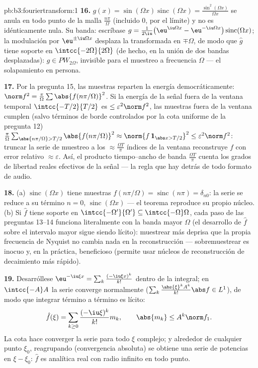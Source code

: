 \begin{solution}{pb:b3:fouriertransform:1}
\textbf{16.} $g(x) = \sin(\Omega x)\operatorname{sinc}
(\Omega x) = \frac{\sin^2(\Omega x)}{\Omega x}$ se anula en todo punto
de la malla $\frac{n\pi}\Omega$ (incluido $0$, por el límite) y no es
idénticamente nula. Su banda: escríbase $g =
\frac1{2\iu}\bigl(\eu^{\iu\Omega x} - \eu^{-\iu\Omega
x}\bigr)\operatorname{sinc}(\Omega x)$; la modulación por
$\eu^{\pm\iu\Omega x}$ desplaza la transformada en $\mp\Omega$, de modo
que $\hat g$ tiene soporte en $\intcc{-2\Omega}{2\Omega}$ (de hecho, en
la unión de dos bandas desplazadas): $g \in PW_{2\Omega}$, invisible
para el muestreo a frecuencia $\Omega$ --- el solapamiento en persona.

\textbf{17.} Por la pregunta 15, las muestras reparten la energía
democráticamente: $\norm f^2 = \frac\pi\Omega\sum
\abs{f(n\pi/\Omega)}^2$. Si la energía de la señal fuera de la ventana
temporal $\intcc{-T/2}{T/2}$ es $\leq \varepsilon^2\norm
f^2$, las muestras fuera de la ventana cumplen (salvo términos de borde
controlados por la cota uniforme de la pregunta 12)
$\frac\pi\Omega\sum_{\abs{n\pi/\Omega} > T/2}
\abs{f(n\pi/\Omega)}^2 \approx \norm{f\,\mathbf 1_{\abs x >
T/2}}^2 \leq \varepsilon^2\norm f^2$: truncar la serie de muestreo a los
$\approx \frac{\Omega T}\pi$ índices de la ventana reconstruye $f$ con
error relativo $\approx\varepsilon$. Así, el producto tiempo--ancho de
banda $\frac{\Omega T}{\pi}$ cuenta los grados de libertad reales
efectivos de la señal --- la regla que hay detrás de todo formato de
audio.

\textbf{18.} (a) $\operatorname{sinc}(\Omega x)$ tiene muestras
$f(n\pi/\Omega) = \operatorname{sinc}(n\pi) =
\delta_{n0}$: la serie se reduce a su término $n = 0$,
$\operatorname{sinc}(\Omega x)$ --- el teorema reproduce su propio
núcleo. (b) Si $\hat f$ tiene soporte en
$\intcc{-\Omega'}{\Omega'} \subseteq
\intcc{-\Omega}\Omega$, cada paso de las preguntas 13--14 funciona
literalmente con la banda mayor $\Omega$ (el desarrollo de $\hat f$
sobre el intervalo mayor sigue siendo lícito): muestrear más deprisa que
la propia frecuencia de Nyquist no cambia nada en la reconstrucción ---
sobremuestrear es inocuo y, en la práctica, beneficioso (permite usar
núcleos de reconstrucción de decaimiento más rápido).

\textbf{19.} Desarróllese $\eu^{-\iu\xi x} =
\sum_k\frac{(-\iu\xi x)^k}{k!}$ dentro de la integral; en $\intcc{-A}A$
la serie converge normalmente
($\sum_k\frac{\abs{\xi}^kA^k}{k!}\abs f \in L^1$), de modo que integrar
término a término es lícito:
\[
\hat f(\xi) = \sum_{k\geq0}\frac{(-\iu\xi)^k}{k!}m_k,
\qquad \abs{m_k} \leq A^k\norm f_1 .
\]
La cota hace converger la serie para todo $\xi$ complejo; y alrededor de
cualquier punto $\xi_0$, reagrupando (convergencia absoluta) se obtiene
una serie de potencias en $\xi - \xi_0$: $\hat f$ es analítica real con
radio infinito en todo punto.


\end{solution}
